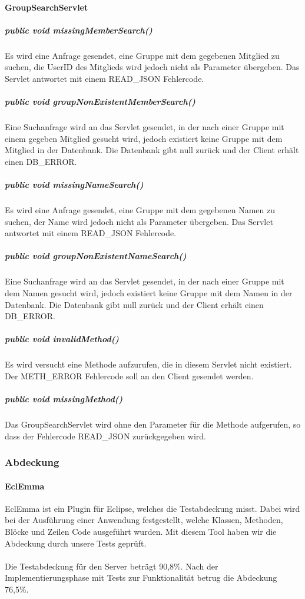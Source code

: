 \documentclass{scrartcl}
\begin{document}
\paragraph{GroupSearchServlet}
\subparagraph{public void missingMemberSearch()}
Es wird eine Anfrage gesendet, eine Gruppe mit dem gegebenen Mitglied zu suchen, die UserID des Mitglieds wird jedoch nicht als Parameter übergeben. Das Servlet antwortet mit einem READ\_JSON Fehlercode.
\subparagraph{public void groupNonExistentMemberSearch()}
Eine Suchanfrage wird an das Servlet gesendet, in der nach einer Gruppe mit einem gegeben Mitglied gesucht wird, jedoch existiert keine Gruppe mit dem Mitglied in der Datenbank. Die Datenbank gibt null zurück und der Client erhält einen DB\_ERROR.
\subparagraph{public void missingNameSearch()}
Es wird eine Anfrage gesendet, eine Gruppe mit dem gegebenen Namen zu suchen, der Name wird jedoch nicht als Parameter übergeben. Das Servlet antwortet mit einem READ\_JSON Fehlercode.
\subparagraph{public void groupNonExistentNameSearch()}
Eine Suchanfrage wird an das Servlet gesendet, in der nach einer Gruppe mit dem Namen gesucht wird, jedoch existiert keine Gruppe mit dem Namen in der Datenbank. Die Datenbank gibt null zurück und der Client erhält einen DB\_ERROR.
\subparagraph{public void invalidMethod()}
Es wird versucht eine Methode aufzurufen, die in diesem Servlet nicht existiert. Der METH\_ERROR Fehlercode soll an den Client gesendet werden.
\subparagraph{public void missingMethod()}
Das GroupSearchServlet wird ohne den Parameter für die Methode aufgerufen, so dass der Fehlercode READ\_JSON zurückgegeben wird.

\newpage
\subsubsection{Abdeckung}
\paragraph{EclEmma}
EclEmma ist ein Plugin für Eclipse, welches die Testabdeckung misst. Dabei wird bei der Ausführung einer Anwendung festgestellt, welche Klassen, Methoden, Blöcke und Zeilen Code ausgeführt wurden. 
Mit diesem Tool haben wir die Abdeckung durch unsere Tests geprüft.
\paragraph{}
Die Testabdeckung für den Server beträgt 90,8\%.
Nach der Implementierungsphase mit Tests zur Funktionalität betrug die Abdeckung 76,5\%.
\end{document}
